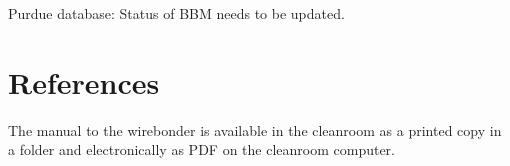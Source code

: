 \documentclass[12pt]{unlsilabsop}
\begin{document}
Purdue database: Status of BBM needs to be updated.

\section{References}

The manual to the wirebonder is available in the cleanroom as a printed copy in a folder and electronically as PDF on the cleanroom computer.
\end{document}
